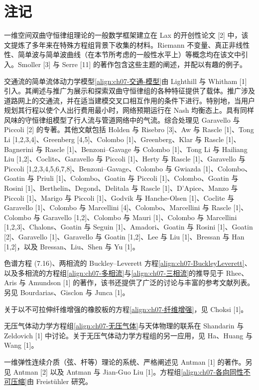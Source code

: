 \documentclass[../../main.tex]{subfiles}
\begin{document}
\section{注记}\label{section:ch07-注记}

一维空间双曲守恒律组理论的一般数学框架建立在 Lax 的开创性论文 [2] 中，该文提炼了多年来在特殊方程组背景下收集的材料。Riemann 不变量、真正非线性性、简单波与简单波曲线（在本节所考虑的一般性水平上）等概念均在该文中引入。Smoller [3] 与 Serre [11] 的著作包含这些主题的阐述，并配以有趣的例子。

交通流的简单流体动力学模型\eqref{align:ch07-交通-模型}由 Lighthill 与 Whitham [1] 引入。其阐述与推广为展示和探索双曲守恒律组的各种特征提供了载体。推广涉及道路网上的交通流，并在适当建模交叉口相互作用的条件下进行。特别地，当用户规划其行程以使个人出行费用最小时，网络预期运行在 Nash 均衡态上。具有同样风味的守恒律组模型了行人流与管道网络中的气流。综合处理见 Garavello 与 Piccoli [2] 的专著。其他文献包括 Holden 与 Risebro [3]、Aw 与 Rascle [1]、Tong Li [1,2,3,4]、Greenberg [4,5]、Colombo [1]、Greenberg、Klar 与 Rascle [1]、Bagnerini 与 Rascle [1]、Benzoni--Gavage 与 Colombo [1]、Tong Li 与 Hailiang Liu [1,2]、Coclite、Garavello 与 Piccoli [1]、Herty 与 Rascle [1]、Garavello 与 Piccoli [1,2,3,4,5,6,7,8]、Benzoni--Gavage、Colombo 与 Gwiazda [1]、Colombo、Goatin 与 Priuli [1]、Colombo、Goatin 与 Piccoli [1]、Colombo、Goatin 与 Rosini [1]、Berthelin、Degond、Delitala 与 Rascle [1]、D'Apice、Manzo 与 Piccoli [1]、Marigo 与 Piccoli [1]、Godvik 与 Hanche-Olsen [1]、Coclite 与 Garavello [1]、Colombo 与 Marcellini [4]、Colombo、Marcellini 与 Rascle [1]、Colombo 与 Garavello [1,2]、Colombo 与 Mauri [1]、Colombo 与 Marcellini [1,2,3]、Chalons、Goatin 与 Seguin [1]、Amadori、Goatin 与 Rosini [1]、Goatin [2]、Garavello [1]、Garavello 与 Goatin [1,2]、Lee 与 Liu [1]、Bressan 与 Han [1,2]，以及 Bressan、Liu、Shen 与 Yu [1]。

色谱方程 (7.16)、两相流的 Buckley--Leverett 方程\eqref{align:ch07-BuckleyLeverett}、以及多相流的方程组\eqref{align:ch07-多相流}与\eqref{align:ch07-三相流}的推导见于 Rhee、Aris 与 Amundson [1] 的著作，该书还提供了广泛的讨论与丰富的参考文献列表。另见 Bourdarias、Gisclon 与 Junca [1]。

关于以不可拉伸纤维增强的橡胶板的方程\eqref{align:ch07-纤维增强}，见 Choksi [1]。

无压气体动力学方程组\eqref{align:ch07-无压气体}与天体物理的联系在 Shandarin 与 Zeldovich [1] 中讨论。关于无压气体动力学方程组的另一应用，见 Ha、Huang 与 Wang [1]。

一维弹性连续介质（弦、杆等）理论的系统、严格阐述见 Antman [1] 的著作。另见 Antman [2] 以及 Antman 与 Jian-Guo Liu [1]。方程组\eqref{align:ch07-各向同性不可压缩}由 Freistühler 研究。
\end{document}
